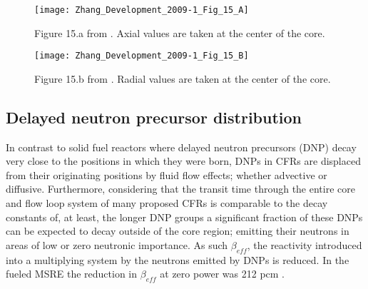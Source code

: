 \documentclass[review]{elsarticle}
\begin{document}
\begin{figure}[h]
   \centering
   \texttt{[image: Zhang\_Development\_2009-1\_Fig\_15\_A]}
   \caption{Figure 15.a from \cite{zhang_development_2009-1}. 
               Axial
               values are taken at the center of the core.}
   \label{fig:zhang_axial_velocity_flux}
\end{figure}

\begin{figure}[h]
   \centering
   \texttt{[image: Zhang\_Development\_2009-1\_Fig\_15\_B]}
   \caption{Figure 15.b from \cite{zhang_development_2009-1}.
               Radial 
               values are taken at the center of the core.}
   \label{fig:zhang_radial_velocity_flux}
\end{figure}

\subsection{Delayed neutron precursor distribution} \label{ssec:dnpd}
In contrast to solid fuel reactors where delayed neutron precursors (DNP) decay
 very close to the positions in which they were born, DNPs in CFRs are displaced
 from their originating positions by fluid flow effects; whether advective or
 diffusive. Furthermore, considering that the transit time through the entire
 core and flow loop system of many proposed CFRs is comparable to the decay
 constants of, 
 at least, the longer DNP groups a significant fraction of these DNPs can be
expected to decay outside of the core region; emitting their neutrons in areas
of low or zero neutronic importance. As such $\beta_{eff}$, the reactivity
 introduced into a multiplying system by the neutrons emitted by DNPs
is reduced. In the  fueled MSRE the reduction in $\beta_{eff}$ at
zero power was 212 pcm \cite{delpech_benchmark_2003}.
\end{document}
